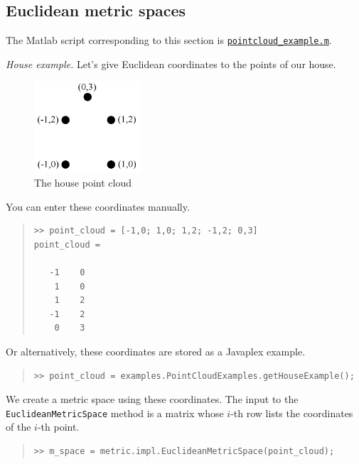 \documentclass[amscd, amssymb, verbatim]{amsart}[12pt]
\theoremstyle{remark}
\theoremstyle{remark}
\theoremstyle{remark}
\begin{document}
\subsection{Euclidean metric spaces}\label{SS:euclidean-metric}
The Matlab script corresponding to this section is \href{https://github.com/appliedtopology/javaplex/tree/master/src/matlab/for_distribution/tutorial_examples/pointcloud_example.m}{\texttt{pointcloud\_example.m}}. 

{\em House example.} Let's give Euclidean coordinates to the points of our house.

\vspace{-3mm}
\begin{figure}[htb]
	\centering
	\includegraphics[width=1.55in]{houseCoord.pdf}
	\vspace{-3mm}
	\caption{The house point cloud}
	\label{fig:housePointCloud}
\end{figure}
\FloatBarrier

You can enter these coordinates manually.

\begin{quote} \begin{verbatim}
>> point_cloud = [-1,0; 1,0; 1,2; -1,2; 0,3]
point_cloud =

   -1    0
    1    0
    1    2
   -1    2
    0    3
\end{verbatim} \end{quote}

Or alternatively, these coordinates are stored as a Javaplex example.

\begin{quote} \begin{verbatim}
>> point_cloud = examples.PointCloudExamples.getHouseExample();
\end{verbatim} \end{quote}

We create a metric space using these coordinates. The input to the \texttt{EuclideanMetricSpace} method is a matrix whose $i$-th row lists the coordinates of the $i$-th point.

\begin{quote} \begin{verbatim}
>> m_space = metric.impl.EuclideanMetricSpace(point_cloud); 
\end{verbatim} \end{quote}
\end{document}
